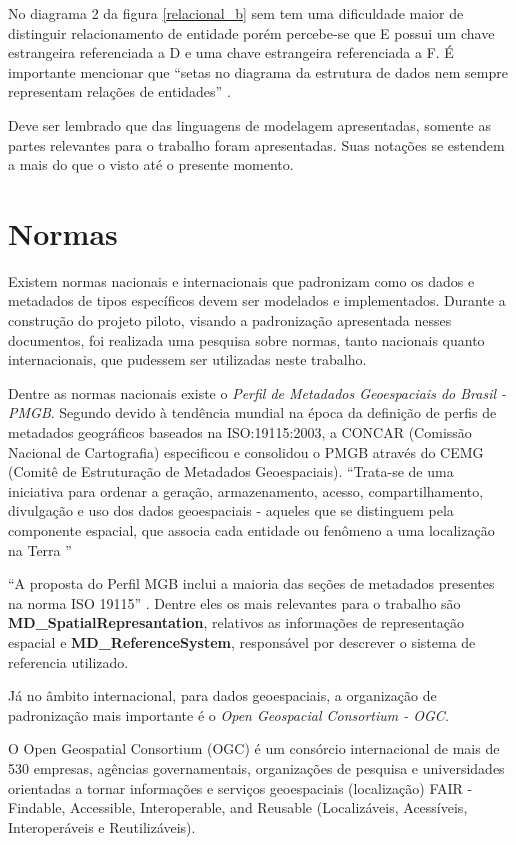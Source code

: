 No diagrama 2 da figura \ref{relacional_b} sem tem uma dificuldade maior de distinguir relacionamento de entidade porém percebe-se que E possui um chave estrangeira referenciada a D e uma chave estrangeira referenciada a F. É importante mencionar que ``setas no diagrama da estrutura de dados nem sempre representam relações de entidades'' \cite[p.31]{chen1976entity}.

Deve ser lembrado que das linguagens de modelagem apresentadas, somente as partes relevantes para o trabalho foram apresentadas. Suas notações se estendem a mais do que o visto até o presente momento.

\section{Normas}
Existem normas nacionais e internacionais que padronizam como os dados e metadados de tipos específicos devem ser modelados e implementados. Durante a construção do projeto piloto, visando a padronização apresentada nesses documentos, foi realizada uma pesquisa sobre normas, tanto nacionais quanto internacionais, que pudessem ser utilizadas neste trabalho. 

Dentre as normas nacionais existe o \textit{Perfil de Metadados Geoespaciais do Brasil - PMGB}. 
Segundo  devido à tendência mundial na época da definição de perfis de metadados geográficos baseados na ISO:19115:2003, a CONCAR (Comissão Nacional de Cartografia) especificou e consolidou o PMGB através do CEMG (Comitê de Estruturação de Metadados Geoespaciais). ``Trata-se de uma iniciativa para ordenar a geração, armazenamento, acesso, compartilhamento, divulgação e uso dos dados geoespaciais - aqueles que se distinguem pela componente espacial, que associa cada entidade ou fenômeno a uma localização na Terra '' \cite[p.10]{pmgb2009}

``A proposta do Perfil MGB inclui a maioria das seções de metadados presentes na norma ISO 19115'' . Dentre eles os mais relevantes para o trabalho são \textbf{MD\_SpatialRepresantation}, relativos as informações de representação espacial e \textbf{MD\_ReferenceSystem}, responsável por descrever o sistema de referencia utilizado.  

Já no âmbito internacional, para dados geoespaciais, a organização de padronização mais importante é o \textit{Open Geospacial Consortium - OGC}. 
\begin{citacao}
O Open Geospatial Consortium (OGC) é um consórcio internacional de mais de 530 empresas, agências governamentais, organizações de pesquisa e universidades orientadas a tornar informações e serviços geoespaciais (localização) FAIR -Findable, Accessible, Interoperable, and Reusable (Localizáveis, Acessíveis, Interoperáveis e Reutilizáveis). \cite[p.1]{ogc}
\end{citacao}

